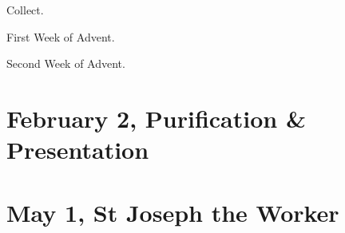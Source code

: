 {{  
  \begin{center}{\large Collect.}\end{center}
  \vspace{-\baselineskip}
  \def\printcollectheading{F}
  {
  \begin{center}{First Week of Advent.}\end{center}
  \def\gabcfolder{../Advent1}
  
  \printcollect{\collect}{\collecttranslation}
  }
  {
  \medskip
  \begin{center}{Second Week of Advent.}\end{center}
  \def\gabcfolder{../Advent2}
  
  \printcollect{\latincomcollect}{\englishcomcollect}
  }

  \bigskip
  \benedicamusdomino{}
}


{
\section{February 2, Purification \& Presentation}
\subtitle{ Class}
\subtitle{I Vespers}

\subtitle{II Vespers}

\def\definevesperspropers{
  \def\prepsalmfive{\greseteolcustos{manual}}
}
\def\definevesperspropersalt{}
\def\vesperspropersnote{At II Vespers:}
\def\vesperspropersaltnote{At I Vespers:}
\def\premagverses{\greseteolcustos{manual}}
\def\prechapter{\label{purification-chapter}}
\def\printfullhymn{
  {\printhymn{\oldstylenums{\hymnlinetwo}}{\hymninitial}{\hymntex}{\hymntranslation}}
  {
    \def\vrlinebreak{T}
    \oldneedspace{3\baselineskip}
    \printvr[\greseteolcustos{manual}]{\vrtex}{\vtranslation}{\rtranslation}
  }
}
\bigskip
\benedicamusdomino{}
}

{
\section{May 1, St Joseph the Worker}
\subtitle{ Class}
\subtitle{I \& II Vespers}

}}
